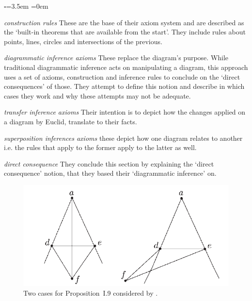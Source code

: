 \documentclass[]{interact}
\theoremstyle{plain}
\theoremstyle{definition}
\theoremstyle{remark}
\newcommand{\quotes}[1]{`#1'}
\begin{document}
\begin{list}{$\square$}{\leftmargin=3.5em \itemindent=0em}
	\item[\textit{construction rules}] These are the base of their axiom
	system and are described as the	\quotes{built-in theorems that are
	available from the start}. They include rules about
	points, lines, circles and intersections of the previous.

	\item[\textit{diagrammatic inference axioms}] These replace the diagram's
	purpose.
	 While traditional diagrammatic inference acts on manipulating a diagram,
	 this approach uses a set of axioms, construction and inference rules to
	 conclude on the \quotes{direct consequences} of those. They attempt to
	 define this notion and describe in which cases they work and why these
	 attempts may not be adequate.

	 \item[\textit{transfer inference axioms}] Their intention is to depict how
	 the changes applied on a diagram by Euclid, translate to their facts.

	 \item[\textit{superposition inferences axioms}] these depict how one
	 diagram relates to another i.e. the rules that apply to the former apply
	 to the latter as well.
	 
	  \item[\textit{direct consequence}] They conclude this section by 
	  explaining the \quotes{direct consequence} notion, that they based their 
	  \quotes{diagrammatic inference} on. 
\end{list}


\begin{figure}[t]
  \centering
  \includegraphics[scale=0.5]{avigad-fig8-I9}
  \caption[Avigad et al Approach I.9]{Two cases for Proposition~I.9
    considered by \citet{avigad-etal:2009}.}
  \label{fig:avigadi9}
\end{figure}
\end{document}
